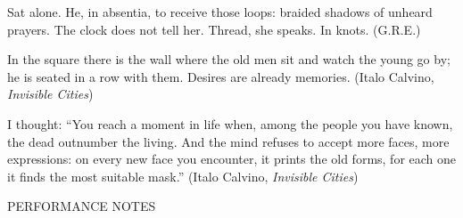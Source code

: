 \documentclass[11pt]{article}
\begin{document}
\begingroup
\begin{center}
Sat alone. He, in absentia, to receive those loops: braided shadows of unheard prayers. The clock does not tell her. Thread, she speaks. In knots.
\rightskip\leftskip
\phantom{text} \hfill (G.R.E.)
\end{center}
\endgroup

\begingroup
\begin{center}
In the square there is the wall where the old men sit and watch the young go by; he is seated in a row with them. Desires are already memories.
\rightskip\leftskip
\phantom{text} \hfill (Italo Calvino, \textit{Invisible Cities})
\end{center}
\endgroup

\begingroup
\begin{center}
I thought: ``You reach a moment in life when, among the people you have known, the dead outnumber the living. And the mind refuses to accept more faces, more expressions: on every new face you encounter, it prints the old forms, for each one it finds the most suitable mask.''
\rightskip\leftskip
\phantom{text} \hfill (Italo Calvino, \textit{Invisible Cities})
\end{center}
\endgroup

\vspace*{3\baselineskip}

\begin{center}
\huge PERFORMANCE NOTES
\end{center}
\end{document}
